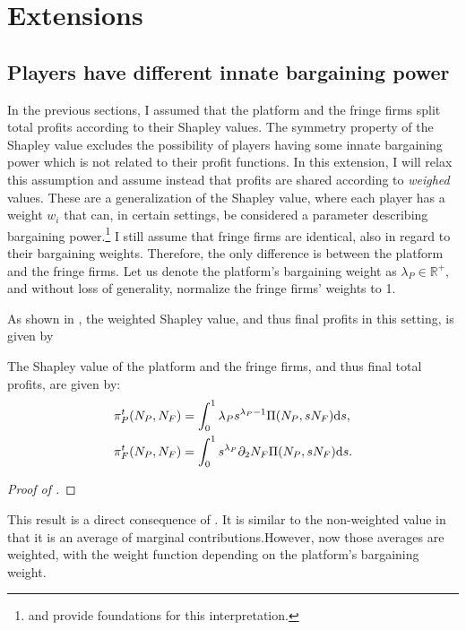 \section{Extensions}
\label{sec:extensions}

\subsection{Players have different innate bargaining power}
\label{sec:higher_bargaining_power}

In the previous sections, I assumed that the platform and the fringe firms split total profits according to their Shapley values.
The symmetry property of the Shapley value excludes the possibility of players having some innate bargaining power which is not related to their profit functions.
In this extension, I will relax this assumption and assume instead that profits are shared according to \emph{weighed} values.
These are a generalization of the Shapley value, where each player has a weight $w_i$ that can, in certain settings, be considered a parameter describing bargaining power.\footnote{
    \textcite{hart1996bargaining} and \textcite{stole1996intra} provide foundations for this interpretation.
}
I still assume that fringe firms are identical, also in regard to their bargaining weights.
Therefore, the only difference is between the platform and the fringe firms.
Let us denote the platform's bargaining weight as $\lambda_P \in \mathbb{R}^+$, and without loss of generality, normalize the fringe firms' weights to 1.

As shown in , the weighted Shapley value, and thus final profits in this setting, is given by
\begin{proposition}
    \label{prop:weighted_shapley_value}
    The Shapley value of the platform and the fringe firms, and thus final total profits, are given by:
    \begin{align*}
        \pi^t_P(N_P, N_F) &= \int_0^1 \lambda_P s ^ {\lambda_P - 1} \Pi(N_P,s N_F) \mathrm{d}s, \\
        \pi^t_F(N_P, N_F) &= \int_0^1 s ^ {\lambda_P} \partial_2 N_F \Pi(N_P,s N_F) \mathrm{d}s.
    \end{align*}
\end{proposition}
\begin{proof}[Proof of ]
\end{proof}
This result is a direct consequence of .
It is similar to the non-weighted value in that it is an average of marginal contributions.However, now those averages are weighted, with the weight function depending on the platform's bargaining weight.

